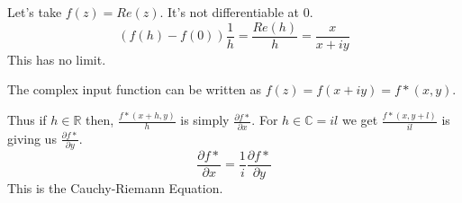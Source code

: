 \documentclass[letter]{article}
\begin{document}

Let's take $f(z) = Re(z)$. It's not differentiable at $0$. 
\[
	(f(h) - f(0)) \frac{1}{h} = \frac{Re(h)}{h} = \frac{x}{x+iy}
\] This has no limit. 

The complex input function can be written as $f(z) = f(x+iy) = f*(x,y)$. 

Thus if $h \in \mathbb{R}$ then, $\frac{f*(x+h,y)}{h} $ is simply $\frac{\partial f*}{\partial x}$. 
For $h \in  \mathbb{C} = i l$ we get $\frac{f*(x,y+l)}{il}$ is giving us $\frac{\partial f*}{\partial y}$. 
\[
\frac{\partial f*}{\partial x} = \frac{1}{i} \frac{\partial f*}{\partial y}
\] This is the Cauchy-Riemann Equation. 
\end{document}
